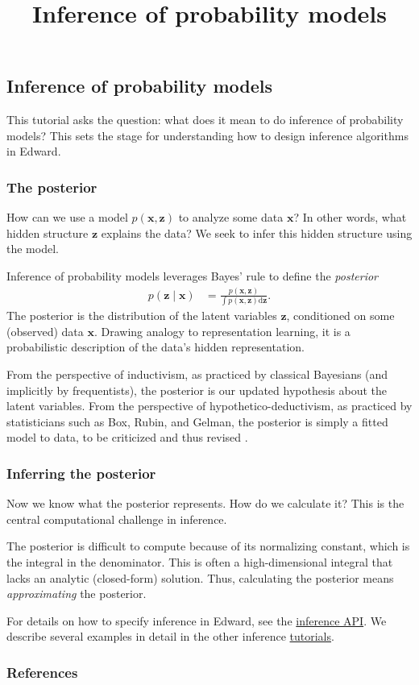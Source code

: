 \title{Inference of probability models}

\subsection{Inference of probability models}

This tutorial asks the question: what does it mean to do inference of
probability models? This sets the stage for understanding how to
design inference algorithms in Edward.

\subsubsection{The posterior}

How can we use a model $p(\mathbf{x}, \mathbf{z})$ to analyze some
data $\mathbf{x}$? In other words, what hidden structure $\mathbf{z}$
explains the data? We seek to infer this hidden structure using the
model.

Inference of probability models leverages Bayes' rule to define the
\emph{posterior}
\begin{align*}
  p(\mathbf{z} \mid \mathbf{x})
  &=
  \frac{p(\mathbf{x}, \mathbf{z})}{\int p(\mathbf{x}, \mathbf{z}) \text{d}\mathbf{z}}.
\end{align*}
The posterior is the distribution of the latent variables
$\mathbf{z}$, conditioned on some (observed) data $\mathbf{x}$.
Drawing analogy to representation learning, it is a probabilistic
description of the data's hidden representation.

From the perspective of inductivism, as practiced by classical
Bayesians (and implicitly by frequentists),
the posterior is our updated hypothesis about the latent variables.
From the perspective of hypothetico-deductivism, as practiced by
statisticians such as Box, Rubin, and Gelman, the posterior is simply
a fitted model to data, to be criticized and thus revised
\citep{box1982apology,gelman2013philosophy}.


\subsubsection{Inferring the posterior}

Now we know what the posterior represents. How do we calculate it? This is the
central computational challenge in inference.

The posterior is difficult to compute because of its normalizing
constant, which is the integral in the denominator.
This is often a high-dimensional integral that lacks an analytic (closed-form)
solution. Thus, calculating the posterior means \emph{approximating} the
posterior.

For details on how to specify inference in Edward, see the
\href{/api/inference}{inference API}. We describe several examples in
detail in the other inference \href{/tutorials/}{tutorials}.


\subsubsection{References}\label{references}

